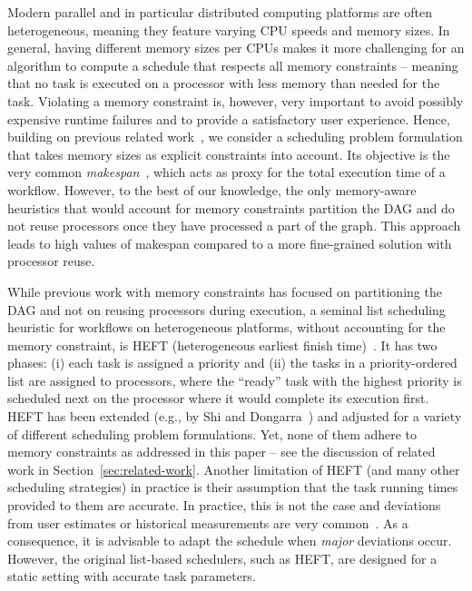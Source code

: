 \documentclass[conference]{IEEEtran}
\newcommand{\skug}[1]{{\color{blue}[SK: #1]}}
\newcommand{\hmey}[1]{{\color{red}[HM: #1]}}
\newcommand{\AB}[1]{\todo[inline]{{\color{purple}[AB: #1]}}}
\begin{document}
Modern parallel and in particular distributed computing platforms are often heterogeneous,
meaning they feature varying CPU speeds and memory sizes. 
In general, having different memory sizes per CPUs makes it more challenging for an algorithm 
to compute a schedule that respects all memory constraints -- meaning that no task is executed on a 
processor with less memory than needed for the task. Violating a memory constraint is, however, 
very important to avoid possibly expensive runtime failures and to provide a satisfactory user experience.
Hence, building on previous related %
work~\cite{gou2020partitioning,He21,DBLP:conf/icpp/KulaginaMB24}, we consider a scheduling problem 
formulation that takes memory sizes as explicit constraints into account. 
Its objective is the very common \emph{makespan}~\cite{liu2018survey}, 
which acts as proxy for the total execution time of a workflow.
However, to the best of our knowledge, the only memory-aware heuristics that would account for 
memory constraints partition the DAG and do not reuse processors once they have processed a part
of the graph. This approach leads to high values of makespan compared to a more fine-grained solution
with processor reuse. 

While previous work with memory constraints has focused on partitioning the DAG and not on 
reusing processors during execution, a seminal list scheduling heuristic for workflows on 
heterogeneous platforms, without accounting for the memory constraint, is HEFT 
(heterogeneous earliest finish time)~\cite{topcuoglu2002performance}.
It has two phases: (i) each task is assigned a priority and (ii) the tasks in a priority-ordered list are assigned
to processors, where the ``ready'' task with the highest priority is scheduled next on the processor
where it would complete its execution first. 
HEFT has been extended (e.g., by Shi and Dongarra~\cite{SHI2006665}) and adjusted 
for a variety of different scheduling problem formulations. 
Yet, none of them adhere to memory constraints as addressed in this paper -- 
see the discussion of related work in Section~\ref{sec:related-work}. 
%    
Another limitation of HEFT (and many other scheduling strategies) in practice is their 
assumption that the task running times provided to them are accurate. In practice, this is 
not the case and deviations from user estimates or historical measurements are 
very common~\cite{hirales2012multiple}. As a consequence, it is advisable to adapt the schedule when \emph{major}
deviations occur. However, the original list-based schedulers, such as HEFT, are designed
for a static setting with accurate task parameters. 
%    
\end{document}
